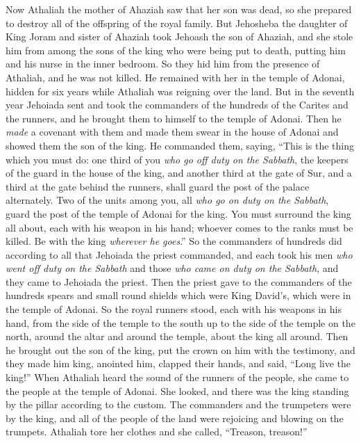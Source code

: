 \begin{biblechapter} %
 Now Athaliah the mother of Ahaziah saw that her son was dead, so she prepared to destroy all of the offspring of the royal family.
\verse But Jehosheba the daughter of King Joram and sister of Ahaziah took Jehoash the son of Ahaziah, and she stole him from among the sons of the king who were being put to death, putting him and his nurse in the inner bedroom. So they hid him from the presence of Athaliah, and he was not killed.
\verse He remained with her in the temple of Adonai, hidden for six years while Athaliah was reigning over the land.
\verse But in the seventh year Jehoiada sent and took the commanders of the hundreds of the Carites and the runners, and he brought them to himself to the temple of Adonai. Then he \textit{made} a covenant with them and made them swear in the house of Adonai and showed them the son of the king.
\verse He commanded them, saying, “This is the thing which you must do: one third of you \textit{who go off duty on the Sabbath}, the keepers of the guard in the house of the king,
\verse and another third at the gate of Sur, and a third at the gate behind the runners, shall guard the post of the palace alternately.
\verse Two of the units among you, all \textit{who go on duty on the Sabbath}, guard the post of the temple of Adonai for the king.
\verse You must surround the king all about, each with his weapon in his hand; whoever comes to the ranks must be killed. Be with the king \textit{wherever he goes}.”
\verse So the commanders of hundreds did according to all that Jehoiada the priest commanded, and each took his men \textit{who went off duty on the Sabbath} and those \textit{who came on duty on the Sabbath}, and they came to Jehoiada the priest.
\verse Then the priest gave to the commanders of the hundreds spears and small round shields which were King David’s, which were in the temple of Adonai.
\verse So the royal runners stood, each with his weapons in his hand, from the side of the temple to the south up to the side of the temple on the north, around the altar and around the temple, about the king all around.
\verse Then he brought out the son of the king, put the crown on him with the testimony, and they made him king, anointed him, clapped their hands, and said, “Long live the king!”
\verse When Athaliah heard the sound of the runners of the people, she came to the people at the temple of Adonai.
\verse She looked, and there was the king standing by the pillar according to the custom. The commanders and the trumpeters were by the king, and all of the people of the land were rejoicing and blowing on the trumpets. Athaliah tore her clothes and she called, “Treason, treason!”

\end{biblechapter}
